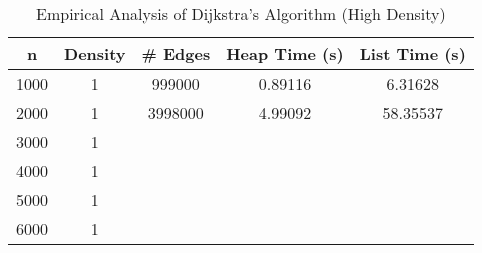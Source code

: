 \documentclass[12pt]{article}
\begin{document}
\begin{table}[h!]
    \centering
    \begin{threeparttable}
        \caption{Empirical Analysis of Dijkstra's Algorithm (High Density)}
        \begin{tabular}{@{}ccccc@{}}
            \toprule
            \textbf{n} & \textbf{Density} & \textbf{\# Edges} & \textbf{Heap Time (s)} & \textbf{List Time (s)} \\ \midrule
            1000        & 1  & 999000   & 0.89116        & 6.31628                 \\
            2000        & 1  & 3998000  & 4.99092        & 58.35537                \\
            3000        & 1  &    &         &                  \\
            4000        & 1  &    &         &                  \\
            5000        & 1  &    &         &                  \\
            6000        & 1  &    &         &                  \\
            \bottomrule
        \end{tabular}
    \end{threeparttable}
\end{table}
\end{document}
